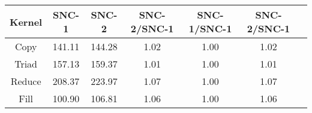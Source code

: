 \begin{tabular}{|c|c|c|c|c|c|c|}  \hline
Kernel&SNC-1&SNC-2 & SNC-2/SNC-1 & SNC-1/SNC-1 & SNC-2/SNC-1 \\ \hline 
Copy & 141.11 & 144.28  & 1.02 & 1.00 & 1.02 \\ \hline 
Triad & 157.13 & 159.37  & 1.01 & 1.00 & 1.01 \\ \hline 
Reduce & 208.37 & 223.97  & 1.07 & 1.00 & 1.07 \\ \hline 
Fill & 100.90 & 106.81  & 1.06 & 1.00 & 1.06 \\ \hline 
\end{tabular}
